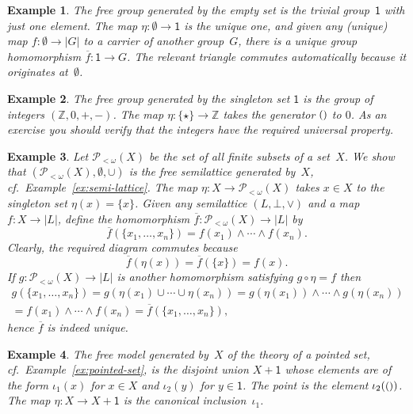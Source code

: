 \documentclass{amsart}
\newcommand{\ZZ}{\mathbb{Z}} %
\newcommand{\carrier}[1]{|#1|} %
\newcommand{\set}[1]{\{#1\}} %
\newcommand{\finpow}[1]{\mathcal{P}_{{<}\omega}(#1)} %
\newcommand{\one}{\mathsf{1}} %
\newcommand{\unit}{{\text{\small$()$}}} %
\newtheorem{example}{Example}[section]
\begin{document}
\begin{example}
  The free group generated by the empty set is the trivial group~$\one$ with
  just one element. The map $\eta : \emptyset \to \one$ is the unique one, and
  given any (unique) map $f : \emptyset \to \carrier{G}$ to a carrier of another
  group~$G$, there is a unique group homomorphism $\overline{f} : \one \to G$.
  The relevant triangle commutes automatically because it originates
  at~$\emptyset$.
\end{example}

\begin{example}
  The free group generated by the singleton set $\one$ is the group of integers
  $(\ZZ, 0, {+}, {-})$. The map $\eta : \set{\star} \to \ZZ$ takes the generator
  $\unit$ to $0$. As an exercise you should verify that the integers have the
  required universal property.
\end{example}

\begin{example}
  Let $\finpow{X}$ be the set of all finite subsets of a set~$X$. We show that
  $(\finpow{X}, \emptyset, {\cup})$ is the free semilattice generated by~$X$, cf.\
  Example~\ref{ex:semi-lattice}. The map $\eta : X \to \finpow{X}$ takes $x \in X$ to the
  singleton set $\eta(x) = \set{x}$. Given any semilattice $(L, \bot, {\vee})$ and a map
  $f : X \to \carrier{L}$, define the homomorphism $\overline{f} : \finpow{X} \to \carrier{L}$ by
  \begin{equation*}
    \overline{f}(\set{x_1, \ldots, x_n}) = f(x_1) \wedge \cdots \wedge f(x_n).
  \end{equation*}
  Clearly, the required diagram commutes because
  \begin{equation*}
    \overline{f}(\eta(x)) = \overline{f}(\set{x}) = f(x).
  \end{equation*}
  If $g : \finpow{X} \to \carrier{L}$ is another homomorphism satisfying $g \circ \eta = f$ then
  \begin{multline*}
    g(\set{x_1, \ldots, x_n})
    = g(\eta(x_1) \cup \cdots \cup \eta(x_n))
    = g(\eta(x_1)) \wedge \cdots \wedge g(\eta(x_n)) \\
    = f(x_1) \wedge \cdots \wedge f(x_n)
    = \overline{f}(\set{x_1, \ldots, x_n}),
  \end{multline*}
  hence $\overline{f}$ is indeed unique.
\end{example}

\begin{example}
  The free model generated by~$X$ of the theory of a pointed set, cf.\
  Example~\ref{ex:pointed-set}, is the disjoint union $X + \one$ whose elements are of the
  form $\iota_1(x)$ for $x \in X$ and $\iota_2(y)$ for $y \in \one$. The point is the
  element $\iota_2(\unit)$. The map $\eta : X \to X + \one$ is the canonical
  inclusion~$\iota_1$.
\end{example}
\end{document}

